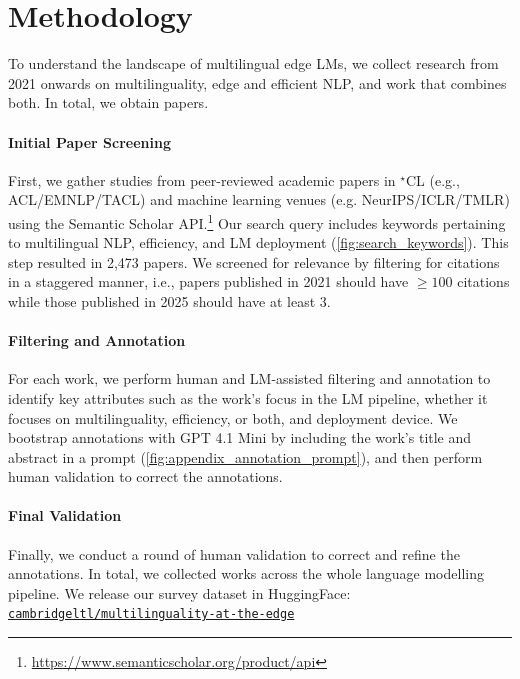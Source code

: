 \documentclass[11pt,a4paper]{article}
\begin{document}
% 
\section{Methodology}
\label{sec:methodology}

To understand the landscape of multilingual edge LMs,
we collect research from 2021 onwards on multilinguality, edge and efficient NLP, and work that combines both.
In total, we obtain \numpapers{} papers.

\paragraph{Initial Paper Screening}
First, we gather studies from peer-reviewed academic papers in $^\star$CL (e.g., ACL/EMNLP/TACL) and machine learning venues (e.g. NeurIPS/ICLR/TMLR) using the Semantic Scholar API.\footnote{\url{https://www.semanticscholar.org/product/api}}
Our search query includes keywords pertaining to multilingual NLP, efficiency, and LM deployment (\autoref{fig:search_keywords}).
This step resulted in 2,473 papers.
We screened for relevance by filtering for citations in a staggered manner, i.e., papers published in 2021 should have $\geq 100$ citations while those published in 2025 should have at least 3.

\paragraph{Filtering and Annotation}
For each work, we perform human and LM-assisted filtering and annotation to identify key attributes such as the work's
focus in the LM pipeline,
whether it focuses on multilinguality, efficiency, or both,
and deployment device.
We bootstrap annotations with GPT 4.1 Mini by including the work's title and abstract in a prompt (\autoref{fig:appendix_annotation_prompt}),
and then perform human validation to correct the annotations.

\paragraph{Final Validation}
Finally, we conduct a round of human validation to correct and refine the annotations.
In total, we collected \numpapers{} works across the whole language modelling pipeline.
\iftaclpubformat
  We release our survey dataset in HuggingFace: \href{https://huggingface.co/datasets/cambridgeltl/multilinguality-at-the-edge}{\texttt{cambridgeltl/\allowbreak multilinguality-at-the-edge}}
\else
\fi
\end{document}
